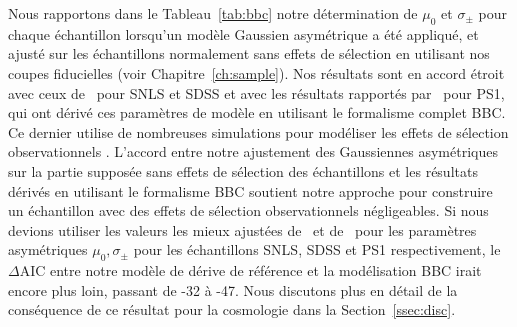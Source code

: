 \documentclass[../main/main.tex]{subfiles}
\begin{document}
Nous rapportons dans le Tableau~\ref{tab:bbc} notre détermination de $\mu_0$ et
$\sigma_{\pm}$ pour chaque échantillon lorsqu'un modèle Gaussien asymétrique a
été appliqué, et ajusté sur les échantillons normalement sans effets de
sélection en utilisant nos coupes fiducielles (voir Chapitre~\ref{ch:sample}).
Nos résultats sont en accord étroit avec ceux de~\cite{scolnic2016} pour SNLS et
SDSS et avec les résultats rapportés par~\cite{scolnic2018} pour PS1, qui ont
dérivé ces paramètres de modèle en utilisant le formalisme complet BBC. Ce
dernier utilise de nombreuses simulations pour modéliser les effets de
sélection observationnels \citep[voir les détails par exemple Section~3 de][et
le Chapitre~\ref{ch:snana}]{kessler2017}. L'accord entre notre ajustement des
Gaussiennes asymétriques sur la partie supposée sans effets de sélection des
échantillons et les résultats dérivés en utilisant le formalisme BBC soutient
notre approche pour construire un échantillon avec des effets de sélection
observationnels négligeables. Si nous devions utiliser les valeurs les mieux
ajustées de~\cite{scolnic2016} et de~\cite{scolnic2018} pour les paramètres
asymétriques $\mu_0,\sigma_{\pm}$ pour les échantillons SNLS, SDSS et PS1
respectivement, le $\Delta$AIC entre notre modèle de dérive de référence
et la modélisation BBC irait encore plus loin, passant de -32 à -47. Nous
discutons plus en détail de la conséquence de ce résultat pour la cosmologie
dans la Section~\ref{ssec:disc}.
\end{document}
